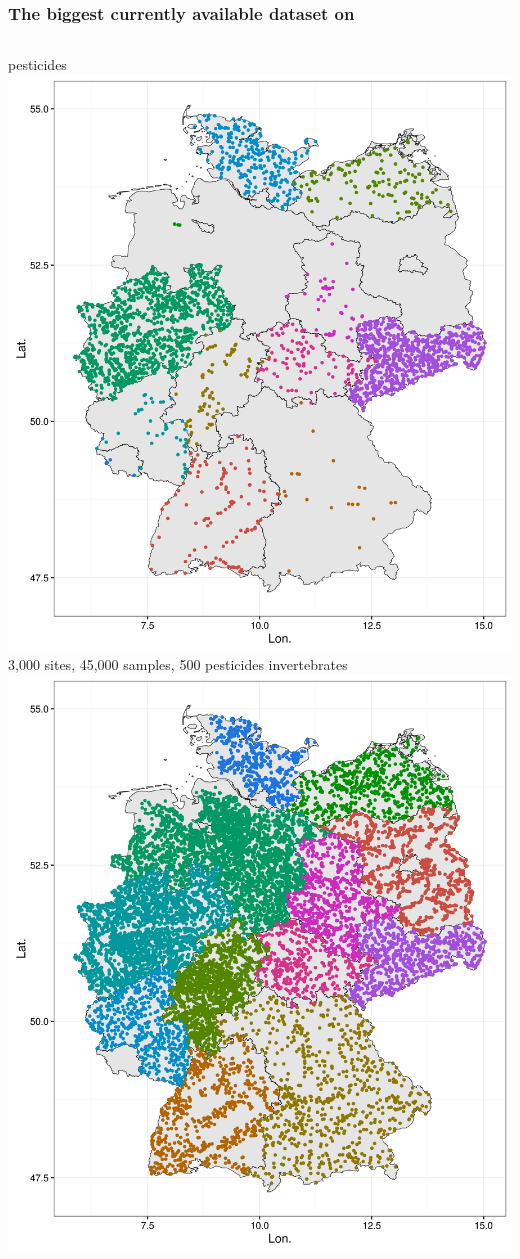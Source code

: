 \documentclass[12pt
, t
]{beamer}
\begin{document}
\begin{frame}
\frametitle{The biggest currently available dataset on}
	\begin{columns}[t]
	pesticides
	\includegraphics[width = \textwidth]{fig/phch_map.png} \\
	3,000 sites, 45,000 samples, 500 pesticides
	invertebrates
	\includegraphics[width = \textwidth]{fig/mzb_map.png} \\

\end{columns}
\end{frame}
\end{document}
